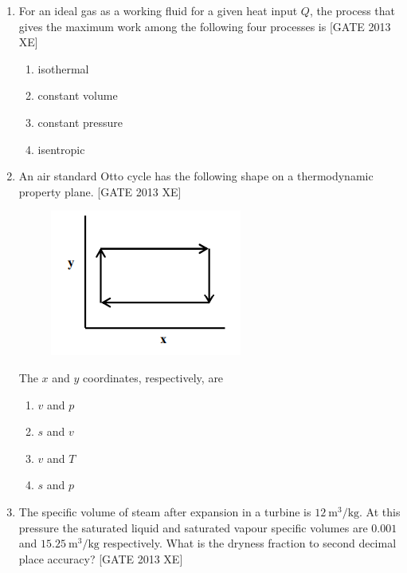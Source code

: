 \documentclass[journal,12pt,onecolumn]{IEEEtran}
\theoremstyle{remark}
\begin{document}
\begin{enumerate}
\item For an ideal gas as a working fluid for a given heat input $Q$, the process that gives the maximum work among the following four processes is \hfill[GATE 2013 XE]
\begin{multicols}{4}
\begin{enumerate}
\item isothermal
\item constant volume
\item constant pressure
\item isentropic
\end{enumerate}
\end{multicols}

\item An air standard Otto cycle has the following shape on a thermodynamic property plane. \hfill[GATE 2013 XE]

\begin{figure}[H]
    \centering
    \includegraphics[width=0.5\columnwidth]{figs/fig25.png}
    \caption{}
    \label{fig:fig25}
\end{figure}
The $x$ and $y$ coordinates, respectively, are
\begin{multicols}{4}
\begin{enumerate}
\item $v$ and $p$
\item $s$ and $v$
\item $v$ and $T$
\item $s$ and $p$
\end{enumerate}
\end{multicols}

\item The specific volume of steam after expansion in a turbine is $12 \ \mathrm{m^3/kg}$. At this pressure the saturated liquid and saturated vapour specific volumes are $0.001$ and $15.25 \ \mathrm{m^3/kg}$ respectively. What is the dryness fraction to second decimal place accuracy? \underline{\hspace{2cm}} \hfill[GATE 2013 XE]


\end{enumerate}
\end{document}
